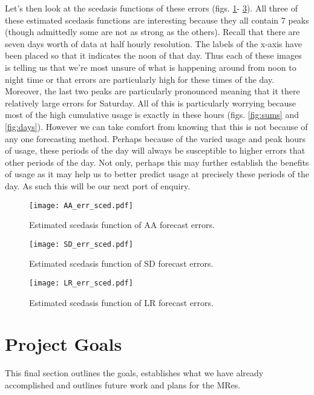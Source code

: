 \documentclass[a4paper]{article}
\begin{document}
Let's then look at the scedasis functions of these errors (figs. \ref{fig:AA_err_sced}- \ref{fig:LR_err_sced}). All three of these estimated scedasis functions are interesting because they all contain 7 peaks (though admittedly some are not as strong as the others). Recall that there are seven days worth of data at half hourly resolution. The labels of the x-axis have been placed so that it indicates the noon of that day. Thus each of these images is telling us that we're most unsure of what is happening around from noon to night time or that errors are particularly high for these times of the day. Moreover, the last two peaks are particularly pronounced meaning that it there relatively large errors for Saturday. All of this is particularly worrying because most of the high cumulative usage is exactly in these hours (figs. \ref{fig:sums} and \ref{fig:days}). However we can take comfort from knowing that this is not because of any one forecasting method. Perhaps because of the varied usage and peak hours of usage, these periods of the day will always be susceptible to higher errors that other periods of the day. Not only, perhaps this may further establish the benefits of usage as it may help us to better predict usage at precisely these periods of the day. As such this will be our next port of enquiry.

\begin{figure}
\centering
\texttt{[image: AA\_err\_sced.pdf]}
\caption{\label{fig:AA_err_sced} Estimated scedasis function of AA forecast errors.}
\end{figure}

\begin{figure}
\centering
\texttt{[image: SD\_err\_sced.pdf]}
\caption{\label{fig:SD_err_sced} Estimated scedasis function of SD forecast errors.}
\end{figure}

\begin{figure}
\centering
\texttt{[image: LR\_err\_sced.pdf]}
\caption{\label{fig:LR_err_sced} Estimated scedasis function of LR forecast errors.}
\end{figure}




\clearpage
\section{Project Goals}
\label{sec:goals}
This final section outlines the goals, establishes what we have already accomplished and outlines future work and plans for the MRes.
\end{document}
